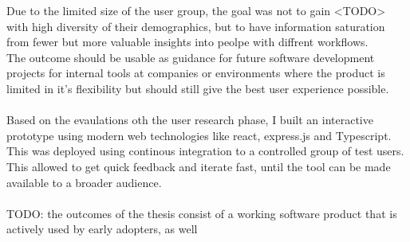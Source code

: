Due to the limited size of the user group, the goal was not to gain <TODO> with high diversity of their demographics, but to have information saturation from fewer but more valuable insights into peolpe with diffrent workflows.
\\
The outcome should be usable as guidance for future software development projects for internal tools at companies or environments where the product is limited in it's flexibility but should still give the best user experience possible.
\\\\
Based on the evaulations oth the user research phase, I built an interactive prototype using modern web technologies like react, express.js and Typescript.
This was deployed using continous integration to a controlled group of test users. This allowed to get quick feedback and iterate fast, until the tool can be made available to a broader audience.
\\\\
TODO: the outcomes of the thesis consist of a working software product that is actively used by early adopters, as well 

\cleardoublepage
